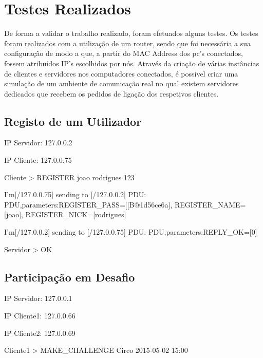\documentclass[runningheads,a4paper]{llncs}
\begin{document}
\section{Testes Realizados}

De forma a validar o trabalho realizado, foram efetuados alguns testes. Os testes foram realizados com a utilização de um router, sendo que foi necessária a sua configuração de modo a que, a partir do MAC Address dos pc’s conectados, fossem atribuídos IP’s escolhidos por nós. Através da criação de várias instâncias de clientes e servidores nos computadores conectados, é possível criar uma simulação de um ambiente de comunicação real no qual existem servidores dedicados que recebem os pedidos de ligação dos respetivos clientes.

\subsection{Registo de um Utilizador}

\begin{itemsize}

\item IP Servidor: 127.0.0.2
\item IP Cliente: 127.0.0.75

\end{itemsize}

Cliente > REGISTER joao rodrigues 123

I'm[/127.0.0.75] sending to [/127.0.0.2] PDU: PDU,parameters:{REGISTER_PASS=[[B@1d56ce6a], REGISTER_NAME=[joao], REGISTER_NICK=[rodrigues]}

I'm[/127.0.0.2] sending to [/127.0.0.75] PDU: PDU,parameters:{REPLY_OK=[0]}

Servidor > OK

\subsection{Participação em Desafio}

\begin{itemsize}

\item IP Servidor: 127.0.0.1
\item IP Cliente1: 127.0.0.66
\item IP Cliente2: 127.0.0.69

\end{itemsize}

Cliente1 > MAKE_CHALLENGE Circo 2015-05-02 15:00
\end{document}
